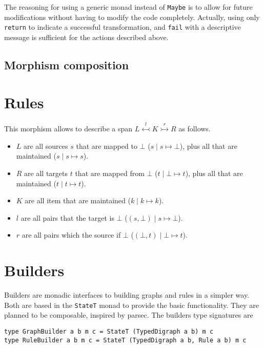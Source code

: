 \documentclass[a4paper]{report}
\begin{document}
The reasoning for using a generic monad instead of \texttt{Maybe} is to allow for future modifications without having to modify the code completely. Actually, using only \texttt{return} to indicate a successful transformation, and \texttt{fail} with a descriptive message is sufficient for the actions described above.

\subsection{Morphism composition}


\section{Rules}
This morphism allows to describe a span $L \overset{l}{\leftarrowtail} K \overset{r}{\rightarrowtail} R$ as follows.

\begin{itemize}
	\item $L$ are all sources $s$ that are mapped to $\bot$ ($s \mid s \mapsto \bot$), plus all that are maintained ($s \mid s \mapsto s$).
	\item $R$ are all targets $t$ that are mapped from $\bot$ ($t \mid \bot \mapsto t$), plus all that are maintained ($t \mid t \mapsto t$).
	\item $K$ are all item that are maintained ($k \mid k \mapsto k$).
	\item $l$ are all pairs that the target is $\bot$ ($(s, \bot) \mid s \mapsto \bot$).
	\item $r$ are all pairs which the source if $\bot$ ($(\bot, t) \mid \bot \mapsto t$).
\end{itemize}

\section{Builders}
Builders are monadic interfaces to building graphs and rules in a simpler way. Both are based in the \texttt{StateT} monad to provide the basic functionality. They are planned to be composable, inspired by parsec. The builders type signatures are

\begin{verbatim}
type GraphBuilder a b m c = StateT (TypedDigraph a b) m c
type RuleBuilder a b m c = StateT (TypedDigraph a b, Rule a b) m c
\end{verbatim}
\end{document}
